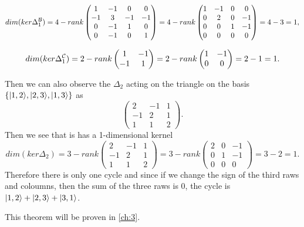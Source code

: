 \documentclass[../2.tex]{subfiles}
\begin{document}
{    \[ dim(ker\Delta_1^{\mathcal{B}}) = 4 - rank
    \begin{pmatrix}
        1 & -1 & 0 & 0  \\
        -1 & 3 & -1 & -1 \\
        0 & -1 & 1 & 0  \\
        0 & -1 & 0 & 1 
    \end{pmatrix} = 4 - rank
    \begin{pmatrix}
        1 & -1 & 0 & 0  \\
        0 & 2 & 0 & -1 \\
        0 & 0 & 1 & -1  \\
        0 & 0 & 0 & 0 
    \end{pmatrix} = 4 - 3 = 1,\]
    
    \[ dim(ker\Delta_1^{\mathcal{C}}) = 2 - rank
    \begin{pmatrix}
        1 & -1 \\
        -1 & 1
    \end{pmatrix} = 2 - rank
    \begin{pmatrix}
        1 & -1 \\
        0 & 0
    \end{pmatrix} = 2-1 = 1.\]
        
    Then we can also observe the $\Delta_2$ acting on the triangle on the basis $\{| 1,2 \rangle,| 2,3 \rangle,| 1,3 \rangle\}$ as
    \[\begin{pmatrix}
        2 & -1 & 1  \\
        -1 & 2 & 1  \\
        1& 1 & 2 
    \end{pmatrix}.\] 
    Then we see that is has a 1-dimensional kernel
    \[ dim(ker\Delta_2) = 3 - rank
        \begin{pmatrix}
            2 & -1 & 1  \\
            -1 & 2 & 1  \\
            1& 1 & 2 
        \end{pmatrix} = 3 - rank
        \begin{pmatrix}
            2 & 0 & -1  \\
            0 & 1 & -1  \\
            0 & 0 & 0 
        \end{pmatrix} = 3 - 2 =  1. \]
    Therefore there is only one cycle and since if we change the sign of the third raws and coloumns, then the sum 
    of the three raws is 0, the cycle is $| 1,2 \rangle+| 2,3 \rangle+| 3,1 \rangle$.
    
    



        }

    This theorem will be proven in \autoref{ch:3}.
\end{document}
